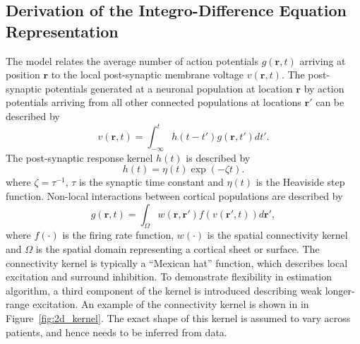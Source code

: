 \documentclass[10pt]{article}
\begin{document}
\subsection{Derivation of the Integro-Difference Equation Representation}
The model relates the average number of action potentials $g(\mathbf{r},t)$ arriving at position $\mathbf{r}$ to the local post-synaptic membrane voltage $v(\mathbf{r},t)$. The post-synaptic potentials generated at a neuronal population at location $\mathbf{r}$ by action potentials arriving from all other connected populations at locations $\mathbf{r}'$ can be described by 
\begin{equation}
	\label{SpikesToPotential} v\left( {\mathbf{r},t} \right) = \int_{ - \infty }^t {h\left( {t - t'} \right)g\left( {\mathbf{r},t'} \right)dt'}. 
\end{equation}
The post-synaptic response kernel $h(t)$ is described by 
\begin{equation}
	\label{SynapticRespKernel} h(t) = \eta(t)\exp{\left(-\zeta t\right)}. 
\end{equation}
where $\zeta=\tau^{-1}$, $\tau$ is the synaptic time constant and $\eta(t)$ is the Heaviside step function. Non-local interactions between cortical populations are described by 
\begin{equation}
	\label{RateBasedInteractions} g\left( \mathbf{r},t \right) = \int_\Omega {w\left( \mathbf{r},\mathbf{r}' \right)f\left( v\left( \mathbf{r}',t \right) \right)d\mathbf{r}'}, 
\end{equation}
where $f(\cdot)$ is the firing rate function, $w(\cdot)$ is the spatial connectivity kernel and $\Omega$ is the spatial domain representing a cortical sheet or surface. The connectivity kernel is typically a ``Mexican hat'' function, which describes local excitation and surround inhibition. To demonstrate flexibility in estimation algorithm, a third component of the kernel is introduced describing weak longer-range excitation. An example of the connectivity kernel is shown in in Figure~\ref{fig:2d_kernel}. The exact shape of this kernel is assumed to vary across patients, and hence needs to be inferred from data.
\end{document}
